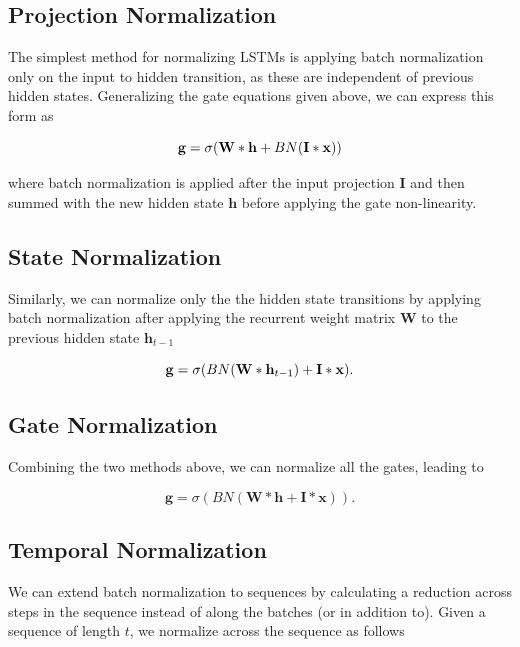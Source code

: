 \documentclass{article}
\def\x{{\mathbf x}}
\begin{document}
\subsection{Projection Normalization} The simplest method for normalizing LSTMs is applying batch normalization only on the input to hidden transition, as these are independent of previous hidden states. Generalizing the gate equations given above, we can express this form as

\begin{equation}
	\mathbf g = \sigma(\mathbf W * \mathbf h + BN(\mathbf I * \x)) \\
\end{equation}
 
where batch normalization is applied after the input projection $\mathbf I$ and then summed with the new hidden state $\mathbf h$ before applying the gate non-linearity.

\subsection{State Normalization} Similarly, we can normalize only the the hidden state transitions by applying batch normalization after applying the recurrent weight matrix $\mathbf W$ to the previous hidden state $\mathbf h_{t-1}$

\begin{equation}
	\mathbf g = \sigma(BN(\mathbf W * \mathbf h_{t-1}) + \mathbf I * \x). \\
\end{equation} 

\subsection{Gate Normalization} Combining the two methods above, we can normalize all the gates, leading to 

\begin{equation}
	\mathbf g = \sigma(BN(\mathbf W * \mathbf h + \mathbf I * \x)).
\end{equation}

\subsection{Temporal Normalization}
We can extend batch normalization to sequences by calculating a reduction across steps in the sequence instead of along the batches (or in addition to). Given a sequence of length $t$, we normalize across the sequence as follows
\end{document}
